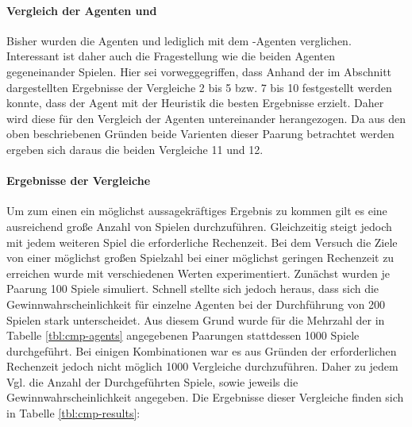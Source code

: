 \paragraph{Vergleich der Agenten  und }
Bisher wurden die Agenten  und  lediglich mit dem -Agenten verglichen. Interessant ist daher auch die Fragestellung wie die beiden Agenten gegeneinander Spielen. Hier sei vorweggegriffen, dass Anhand der im Abschnitt  dargestellten Ergebnisse der Vergleiche 2 bis 5 bzw. 7 bis 10 festgestellt werden konnte, dass der Agent  mit der Heuristik   die besten Ergebnisse erzielt. Daher wird diese für den Vergleich der Agenten untereinander herangezogen. Da aus den oben beschriebenen Gründen beide Varienten dieser Paarung betrachtet werden ergeben sich daraus die beiden Vergleiche 11 und 12.

\paragraph{Ergebnisse der Vergleiche}
\label{p:vgl-result}
Um zum einen ein möglichst aussagekräftiges Ergebnis zu kommen gilt es eine ausreichend große Anzahl von Spielen durchzuführen. Gleichzeitig steigt jedoch mit jedem weiteren Spiel die erforderliche Rechenzeit. Bei dem Versuch die Ziele von einer möglichst großen Spielzahl bei einer möglichst geringen Rechenzeit zu erreichen wurde mit verschiedenen Werten experimentiert. Zunächst wurden je Paarung 100 Spiele simuliert. Schnell stellte sich jedoch heraus, dass sich die Gewinnwahrscheinlichkeit für einzelne Agenten bei der Durchführung von 200 Spielen stark unterscheidet. Aus diesem Grund wurde für die Mehrzahl der in Tabelle \ref{tbl:cmp-agents} angegebenen Paarungen stattdessen 1000 Spiele durchgeführt. Bei einigen Kombinationen war es aus Gründen der erforderlichen Rechenzeit jedoch nicht möglich 1000 Vergleiche durchzuführen. Daher zu jedem Vgl. die Anzahl der Durchgeführten Spiele, sowie jeweils die Gewinnwahrscheinlichkeit angegeben. Die Ergebnisse dieser Vergleiche finden sich in Tabelle \ref{tbl:cmp-results}:

